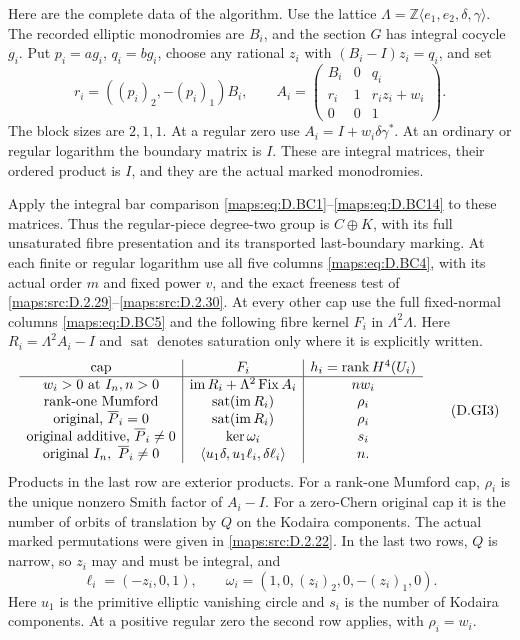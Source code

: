 \begin{theorem}
Here are the complete data of the algorithm. Use the lattice
$\Lambda=\mathbb Z\langle e_1,e_2,\delta,\gamma\rangle$.
The recorded elliptic monodromies are $B_i$, and the section
$G$ has integral cocycle $g_i$. Put $p_i=ag_i$, $q_i=bg_i$,
choose any rational $z_i$ with $(B_i-I)z_i=q_i$, and set
\[
 r_i=((p_i)_2,-(p_i)_1)B_i,\qquad
 A_i=\begin{pmatrix}
 B_i&0&q_i\\ r_i&1&r_i z_i+w_i\\0&0&1
 \end{pmatrix}.                                           \tag{D.GI2}\label{maps:eq:D.GI2}
\]
The block sizes are $2,1,1$. At a regular zero use
$A_i=I+w_i\delta\gamma^*$. At an ordinary or regular
logarithm the boundary matrix is $I$. These are integral
matrices, their ordered product is $I$, and they are the
actual marked monodromies.

Apply the integral bar comparison \eqref{maps:eq:D.BC1}--\eqref{maps:eq:D.BC14} to these
matrices. Thus the regular-piece degree-two group is
$C\oplus K$, with its full unsaturated fibre presentation
and its transported last-boundary marking. At each finite or
regular logarithm use all five columns \eqref{maps:eq:D.BC4}, with its
actual order $m$ and fixed power $v$, and the exact freeness
test of \ref{maps:src:D.2.29}--\ref{maps:src:D.2.30}. At every other cap use the full fixed-normal
columns \eqref{maps:eq:D.BC5} and the following fibre kernel $F_i$ in
$\Lambda^2\Lambda$. Here $R_i=\Lambda^2A_i-I$ and
$\operatorname{sat}$ denotes saturation only where it is
explicitly written.
\[
\begin{array}{c|c|c}
\hbox{cap}&F_i& h_i=\operatorname{rank}H^4(U_i)\\ \hline
w_i>0\hbox{ at }I_n, n>0&
 \operatorname{im}R_i+\Lambda^2\operatorname{Fix}A_i&nw_i\\
\hbox{rank-one Mumford}&\operatorname{sat}(\operatorname{im}R_i)&\rho_i\\
\hbox{original, }\overline P_i=0&
 \operatorname{sat}(\operatorname{im}R_i)&\rho_i\\
\hbox{original additive, }\overline P_i\ne0&\ker\omega_i&s_i\\
\hbox{original }I_n,\ \overline P_i\ne0&
 \langle u_1\delta,u_1\ell_i,\delta\ell_i\rangle&n .
\end{array}                                                \tag{D.GI3}\label{maps:eq:D.GI3}
\]
Products in the last row are exterior products.
For a rank-one Mumford cap, $\rho_i$ is the unique nonzero
Smith factor of $A_i-I$. For a zero-Chern original cap it is
the number of orbits of translation by $Q$ on the Kodaira
components. The actual marked permutations were given in
\ref{maps:src:D.2.22}. In the last two rows, $Q$ is narrow, so $z_i$ may
and must be integral, and
\[
 \ell_i=(-z_i,0,1),\qquad
 \omega_i=(1,0,(z_i)_2,0,-(z_i)_1,0).
                                                               \tag{D.GI4}\label{maps:eq:D.GI4}
\]
Here $u_1$ is the primitive elliptic vanishing circle and
$s_i$ is the number of Kodaira components. At a positive
regular zero the second row applies, with $\rho_i=w_i$.


\end{theorem}
